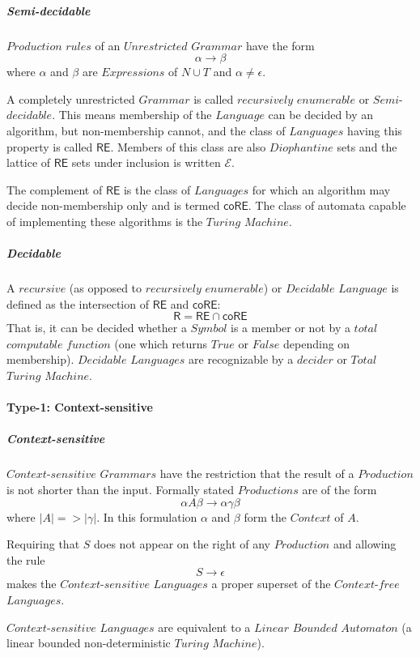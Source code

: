 \documentclass{article}
\begin{document}
    \subparagraph{Semi-decidable}
    $Production$ $rules$ of an $Unrestricted$ $Grammar$ have the form
    \[
        \alpha \rightarrow \beta
    \]
    where $\alpha$ and $\beta$ are $Expressions$ of $N \cup T$ and
    $\alpha \neq \epsilon$.

    A completely unrestricted $Grammar$ is called $recursively$
    $enumerable$ or $Semi$-$decidable$. This means membership of the
    $Language$ can be decided by an algorithm, but non-membership
    cannot, and the class of $Languages$ having this property is
    called $\mathsf{RE}$. Members of this class are also $Diophantine$
    sets and the lattice of $\mathsf{RE}$ sets under inclusion is
    written $\mathcal{E}$.

    The complement of $\mathsf{RE}$ is the class of $Languages$ for
    which an algorithm may decide non-membership only and is termed
    $\mathsf{coRE}$. The class of automata capable of implementing
    these algorithms is the $Turing$ $Machine$.

    \subparagraph{Decidable}
    A $recursive$ (as opposed to $recursively$ $enumerable$) or
    $Decidable$ $Language$ is defined as the intersection of
    $\mathsf{RE}$ and $\mathsf{coRE}$:
    \[
        \mathsf{R} = \mathsf{RE} \cap \mathsf{coRE}
    \]
    That is, it can be decided whether a $Symbol$ is a member or not
    by a $total$ $computable$ $function$ (one which returns $True$ or
    $False$ depending on membership). $Decidable$ $Languages$ are
    recognizable by a $decider$ or $Total$ $Turing$ $Machine$.

\paragraph{Type-1: Context-sensitive}

    \subparagraph{Context-sensitive}
    $Context$-$sensitive$ $Grammars$ have the restriction that the
    result of a $Production$ is not shorter than the input. Formally
    stated $Productions$ are of the form
    \[
        \alpha A \beta \rightarrow \alpha \gamma \beta
    \]
    where $|A| => |\gamma|$. In this formulation $\alpha$ and $\beta$
    form the $Context$ of $A$.

    Requiring that $S$ does not appear on the right of any
    $Production$ and allowing the rule
    \[
        S \rightarrow \epsilon
    \]
    makes the $Context$-$sensitive$ $Languages$ a proper superset of the
    $Context$-$free$ $Languages$.

    $Context$-$sensitive$ $Languages$ are equivalent to a $Linear$
    $Bounded$ $Automaton$ (a linear bounded non-deterministic $Turing$
    $Machine$).
\end{document}
